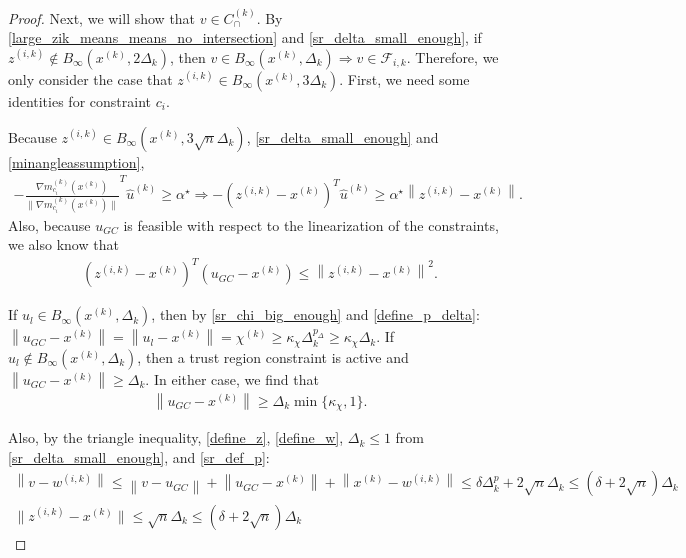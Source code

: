\documentclass{article}
\theoremstyle{case}
\numberwithin{theorem}{subsection}
\newcommand{\capcones}{{C^{(k)}_{\cap}}}
\newcommand{\chik}{{\chi^{(k)}}}
\newcommand{\dk}{\Delta_k}
\newcommand{\fik}{{\mathcal F_{i, k}}}
\newcommand{\gmcik}{{\nabla m_{c_i}^{(k)}\left(\xk\right)}}
\newcommand{\huk}{{{\hat u}^{(k)}}}
\newcommand{\minanglealpha}{{ \alpha^{\star} }}
\newcommand{\tr}{{ B_{\infty}\left(\xk, \dk\right) }}
\newcommand{\wik}{{w^{(i, k)}}}
\newcommand{\xk}{{x^{(k)}}}
\newcommand{\zik}{{z^{(i, k)}}}
\begin{document}
\begin{proof}
Next, we will show that $v \in \capcones$.
By \cref{large_zik_means_means_no_intersection} and \cref{sr_delta_small_enough}, if $\zik \not \in B_{\infty}(\xk, 2\dk)$, then $v \in \tr \Longrightarrow v \in \fik$.
Therefore, we only consider the case that $\zik \in B_{\infty}(\xk, 3\dk)$.
First, we need some identities for constraint $c_i$.

Because $\zik \in B_{\infty}(\xk, 3\sqrt{n} \dk)$, \cref{sr_delta_small_enough} and \cref{minangleassumption}, 
\begin{align}
-\frac {\gmcik}{\|\gmcik\|} ^T\huk \ge \minanglealpha \Longrightarrow -\left(\zik - \xk\right)^T\huk \ge \minanglealpha \left\|\zik - \xk\right\|. \label{u_is_feasible}
\end{align}
Also, because $u_{GC}$ is feasible with respect to the linearization of the constraints, we also know that
\begin{align}
\left(\zik - \xk\right)^T(u_{GC} - \xk) \le \left\|\zik - \xk\right\|^2. \label{gc_is_feasible}
\end{align}

If $u_l \in \tr$, then by \cref{sr_chi_big_enough} and \cref{define_p_delta}: $\left\|u_{GC} - \xk\right\|  = \left\|u_{l} - \xk\right\| = \chik \ge \kappa_{\chi} \dk^{p_{\Delta}} \ge  \kappa_{\chi} \dk$.
If $u_l \not \in \tr$, then a trust region constraint is active and $\left\|u_{GC} - \xk\right\| \ge \dk$.
In either case, we find that 
\begin{align}
\left\|u_{GC} - \xk\right\| \ge \dk \min\{\kappa_{\chi}, 1 \} \label{gc_big_enough}.
\end{align}


Also, by the triangle inequality, \cref{define_z}, \cref{define_w}, $\dk \le 1$ from \cref{sr_delta_small_enough}, and \cref{sr_def_p}:
\begin{align}
\left\|v - \wik\right\| \le \left\|v - u_{GC}\right\| + \left\|u_{GC} - \xk \right\| + \left\|\xk - \wik\right\| \le \delta \dk^p + 2\sqrt{n}\dk \le \left(\delta + 2\sqrt{n}\right)\dk \label{sr_v_minus_w_small} \\
\|\zik - \xk \| \le \sqrt{n}\dk \le \left(\delta + 2\sqrt{n}\right)\dk \label{sr_z_minus_x_small}
\end{align}


\end{proof}
\end{document}
